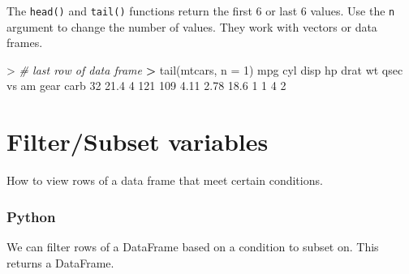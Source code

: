 \documentclass[
]{book}
\newenvironment{Shaded}{\begin{snugshade}}{\end{snugshade}}
\newcommand{\AttributeTok}[1]{\textcolor[rgb]{0.77,0.63,0.00}{#1}}
\newcommand{\CommentTok}[1]{\textcolor[rgb]{0.56,0.35,0.01}{\textit{#1}}}
\newcommand{\DecValTok}[1]{\textcolor[rgb]{0.00,0.00,0.81}{#1}}
\newcommand{\ErrorTok}[1]{\textcolor[rgb]{0.64,0.00,0.00}{\textbf{#1}}}
\newcommand{\FloatTok}[1]{\textcolor[rgb]{0.00,0.00,0.81}{#1}}
\newcommand{\FunctionTok}[1]{\textcolor[rgb]{0.00,0.00,0.00}{#1}}
\newcommand{\NormalTok}[1]{#1}
\newcommand{\SpecialCharTok}[1]{\textcolor[rgb]{0.00,0.00,0.00}{#1}}
\begin{document}
The \texttt{head()} and \texttt{tail()} functions return the first 6 or last 6 values. Use the \texttt{n} argument to change the number of values. They work with vectors or data frames.

\begin{Shaded}
\end{Shaded}

\begin{Shaded}
\begin{Highlighting}[]
\SpecialCharTok{\textgreater{}} \CommentTok{\# last row of data frame}
\ErrorTok{\textgreater{}} \FunctionTok{tail}\NormalTok{(mtcars, }\AttributeTok{n =} \DecValTok{1}\NormalTok{)}
\NormalTok{    mpg cyl disp  hp drat   wt qsec vs am gear carb}
\DecValTok{32} \FloatTok{21.4}   \DecValTok{4}  \DecValTok{121} \DecValTok{109} \FloatTok{4.11} \FloatTok{2.78} \FloatTok{18.6}  \DecValTok{1}  \DecValTok{1}    \DecValTok{4}    \DecValTok{2}
\end{Highlighting}
\end{Shaded}

\hypertarget{filtersubset-variables}{%
\section{Filter/Subset variables}\label{filtersubset-variables}}

How to view rows of a data frame that meet certain conditions.

\hypertarget{python-19}{%
\subsubsection*{Python}\label{python-19}}

We can filter rows of a DataFrame based on a condition to subset on. This returns a DataFrame.
\end{document}
